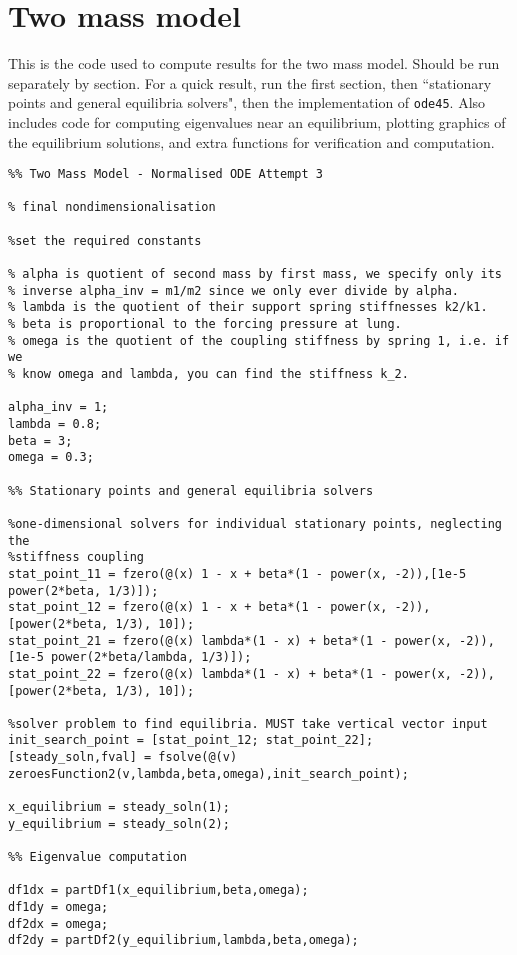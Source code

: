 \documentclass{report}
\begin{document}
\section{Two mass model}

This is the code used to compute results for the two mass model.
Should be run separately by section.
For a quick result, run the first section,
then ``stationary points and general equilibria solvers",
then the implementation of \texttt{ode45}.
Also includes code for computing eigenvalues near an equilibrium,
plotting graphics of the equilibrium solutions,
and extra functions for verification and computation.

\begin{verbatim}
%% Two Mass Model - Normalised ODE Attempt 3

% final nondimensionalisation

%set the required constants

% alpha is quotient of second mass by first mass, we specify only its
% inverse alpha_inv = m1/m2 since we only ever divide by alpha.
% lambda is the quotient of their support spring stiffnesses k2/k1.
% beta is proportional to the forcing pressure at lung.
% omega is the quotient of the coupling stiffness by spring 1, i.e. if we
% know omega and lambda, you can find the stiffness k_2.

alpha_inv = 1;
lambda = 0.8;
beta = 3;
omega = 0.3;

%% Stationary points and general equilibria solvers

%one-dimensional solvers for individual stationary points, neglecting the
%stiffness coupling
stat_point_11 = fzero(@(x) 1 - x + beta*(1 - power(x, -2)),[1e-5 power(2*beta, 1/3)]);
stat_point_12 = fzero(@(x) 1 - x + beta*(1 - power(x, -2)),[power(2*beta, 1/3), 10]);
stat_point_21 = fzero(@(x) lambda*(1 - x) + beta*(1 - power(x, -2)),[1e-5 power(2*beta/lambda, 1/3)]); 
stat_point_22 = fzero(@(x) lambda*(1 - x) + beta*(1 - power(x, -2)),[power(2*beta, 1/3), 10]);

%solver problem to find equilibria. MUST take vertical vector input
init_search_point = [stat_point_12; stat_point_22];
[steady_soln,fval] = fsolve(@(v) zeroesFunction2(v,lambda,beta,omega),init_search_point);

x_equilibrium = steady_soln(1);
y_equilibrium = steady_soln(2);

%% Eigenvalue computation

df1dx = partDf1(x_equilibrium,beta,omega);
df1dy = omega;
df2dx = omega;
df2dy = partDf2(y_equilibrium,lambda,beta,omega);


\end{verbatim}
\end{document}
